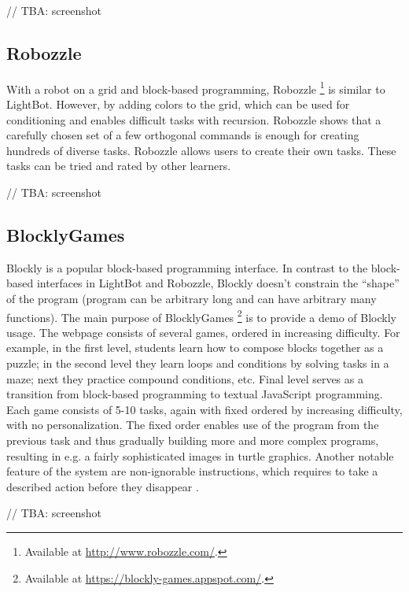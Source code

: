 \documentclass[
    digital,
    color,
    11pt,
    nocover,
    table,  %
    nolof,  %
    nolot,  %
    microtype,
]{fithesis3}
\begin{document}
// TBA: screenshot


\subsection{Robozzle}
\label{sec:robozzle}
With a robot on a grid  and block-based programming, Robozzle%
\footnote{Available at \url{http://www.robozzle.com/}.}
is similar to LightBot.
However, by adding colors to the grid, which can be used for conditioning and enables difficult tasks with recursion.
Robozzle shows that a carefully chosen set of a few orthogonal commands is enough for creating hundreds of diverse tasks.
Robozzle allows users to create their own tasks.
These tasks can be tried and rated by other learners.

// TBA: screenshot


\subsection{BlocklyGames}
\label{sec:blockly-games}
Blockly is a popular block-based programming interface.
In contrast to the block-based interfaces in LightBot and Robozzle,
Blockly doesn’t constrain the “shape” of the program
(program can be arbitrary long and can have arbitrary many functions).
The main purpose of BlocklyGames%
\footnote{Available at \url{https://blockly-games.appspot.com/}.}
is to provide a demo of Blockly usage.
The webpage consists of several games, ordered in increasing difficulty.
For example, in the first level, students learn how to compose blocks together as a puzzle;
in the second level they learn loops and conditions by solving tasks in a maze;
next they practice compound conditions, etc.
Final level serves as a transition from block-based programming to textual JavaScript programming.
Each game consists of 5-10 tasks, again with fixed ordered by increasing difficulty, with no personalization.
The fixed order enables use of the program from the previous task and thus gradually building more and more complex programs,
resulting in e.g. a fairly sophisticated images in turtle graphics.
Another notable feature of the system are non-ignorable instructions,
which requires to take a described action before they disappear
\cite{blockly-10-things}.

// TBA: screenshot
\end{document}
